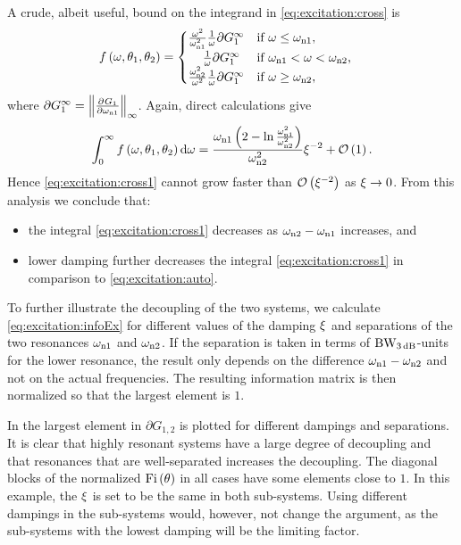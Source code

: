 A crude, albeit useful, bound on the integrand in \eqref{eq:excitation:cross} is
\begin{align}
&f\left(\omega,\theta_1,\theta_2\right)=
  \begin{cases}
   \frac{\omega^2}{\wn[1]^2}
   \frac{1}{\omega}
   \partial G_1^\infty
                                       & \text{if $\omega \leq \wn[1]$,}\\
   \phantom{\frac{\omega^2}{\omega^2}}
   \frac{1}{\omega}
   \partial G_1^\infty
                                       & \text{if $\wn[1] < \omega < \wn[2]$,}\\
   \frac{\wn[2]^2}{\omega^2}
   \frac{1}{\omega}
   \partial G_1^\infty
                                       & \text{if $\omega \geq \wn[2]$,}
  \end{cases}
\end{align}
where $\partial G_1^\infty = \left\|\PartialDerivative{G_1}{\wn[1]}\right\|_\infty$. 
Again, direct calculations give
\begin{align}
\int_0^\infty f\left(\omega,\theta_1,\theta_2\right)\dd\omega = \frac{\wn[1]\left(2-\ln{\frac{\wn[1]^2}{\wn[2]^2}}\right)}{\wn[2]^2}\damping^{-2} + \bigO{1}.
\end{align}
Hence \eqref{eq:excitation:cross1} cannot grow faster than $\bigO{\damping^{-2}}$ as $\damping\rightarrow0$. From this analysis we conclude that:
\begin{itemize}
\item the integral \eqref{eq:excitation:cross1} decreases as $\wn[2]-\wn[1]$ increases, and
\item lower damping further decreases the integral \eqref{eq:excitation:cross1} in comparison to \eqref{eq:excitation:auto}.
\end{itemize}

To further illustrate the decoupling of the two systems, we calculate \eqref{eq:excitation:infoEx} for different values of the damping $\damping$ and separations of the two resonances $\wn[1]$ and $\wn[2]$. If the separation is taken in terms of $\wdB$-units for the lower resonance, the result only depends on the difference $\wn[1]-\wn[2]$ and not on the actual frequencies. The resulting information matrix is then normalized so that the largest element is $1$.

In  the largest element in $\partial G_{1,2}$ is plotted for different dampings and separations. It is clear that highly resonant systems have a large degree of decoupling and that resonances that are well-separated increases the decoupling. 
The diagonal blocks of the normalized $\Fi{\theta}$ in all cases have some elements close to $1$. 
In this example, the $\damping$ is set to be the same in both sub-systems. 
Using different dampings in the sub-systems would, however, not change the argument, as the sub-systems with the lowest damping will be the limiting factor.

